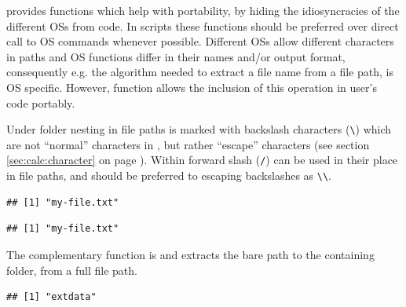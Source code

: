 \documentclass[krantz2]{krantz}\usepackage{knitr}%
\begin{document}
\Rlang provides functions which help with portability, by hiding the idiosyncracies of the different OSs from \Rlang code. In scripts these functions should be preferred over direct call to OS commands whenever possible. Different OSs allow different characters in paths and OS functions differ in their names and/or output format, consequently e.g. the algorithm needed to extract a file name from a file path, is OS specific. However, \Rlang function  allows the inclusion of this operation in user's code portably.

Under  folder nesting in file paths is marked with backslash characters (\verb|\|) which are not ``normal'' characters in \Rlang, but rather ``escape'' characters (see section \ref{sec:calc:character} on page \pageref{sec:calc:character}). Within \Rlang forward slash (\verb|/|) can be used in their place in file paths, and should be preferred to escaping backslashes as \verb|\\|.

\begin{knitrout}\footnotesize
{}\color{fgcolor}\begin{kframe}
\begin{alltt}
\hlstd{(}\hlstd{)}
\end{alltt}
\begin{verbatim}
## [1] "my-file.txt"
\end{verbatim}
\begin{alltt}
\hlstd{(}\hlstd{)}
\end{alltt}
\begin{verbatim}
## [1] "my-file.txt"
\end{verbatim}
\end{kframe}
\end{knitrout}

The complementary function is  and extracts the bare path to the containing folder, from a full file path.
\begin{knitrout}\footnotesize
{}\color{fgcolor}\begin{kframe}
\begin{alltt}
\hlstd{(}\hlstd{)}
\end{alltt}
\begin{verbatim}
## [1] "extdata"
\end{verbatim}
\end{kframe}
\end{knitrout}
\end{document}
